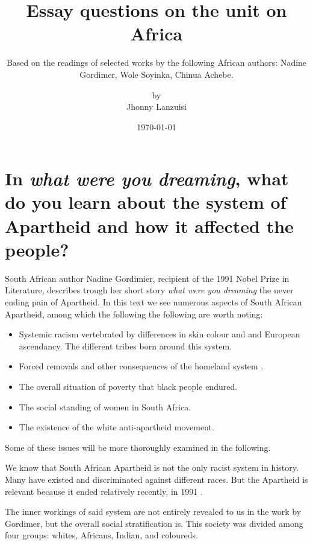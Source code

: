 \documentclass{scrartcl}
\begin{document}
%
%
\title{Essay questions on the unit on Africa}
\subtitle{Based on the readings of selected works
          by the following African authors: Nadine Gordimer,
          Wole Soyinka, Chinua Achebe.
}
\titlehead{Universidad Simón Bolívar\hfill Caracas, Venezuela}
\subject{Literatura en ingles}
\author{by \\ Jhonny Lanzuisi}
\date{\today}
\maketitle

\section[Second Question]{In {\normalfont\em what were you dreaming}, what do you learn about the system of Apartheid and how it affected the people?}

South African author Nadine Gordimier,
recipient of the 1991 Nobel Prize in Literature\cite{noauthor_nadine_2021},
describes trough her short story \textit{what were you dreaming}
the never ending pain of Apartheid.
In this text  we see numerous aspects
of South African Apartheid,
among which the following the following
are worth noting:
\begin{itemize}
\item Systemic racism vertebrated by differences in skin colour and
      and European ascendancy. The different tribes born around this system.
\item Forced removals and other consequences of the homeland system \cite{noauthor_apartheid_2021}.
\item The overall situation of poverty that black people endured.
\item The social standing of women in South Africa.
\item The existence of the white anti-apartheid movement.
\end{itemize}

Some of these issues will be more thoroughly examined in the following.

We know that South African Apartheid is not the only
racist system in history. Many have existed and discriminated
against different races.
But the Apartheid is relevant because it ended relatively
recently, in 1991 \cite{noauthor_apartheid_2021}.

The inner workings of said system are not entirely revealed to us
in the work by Gordimer, but the overall social stratification is.
This society was divided among four groups: whites, Africans, Indian,
and coloureds.
\end{document}
